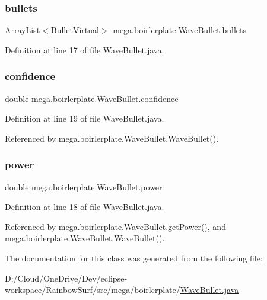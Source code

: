 \subsubsection{\texorpdfstring{bullets}{bullets}}
{\footnotesize\ttfamily Array\+List$<$\hyperlink{classmega_1_1boirlerplate_1_1_bullet_virtual}{Bullet\+Virtual}$>$ mega.\+boirlerplate.\+Wave\+Bullet.\+bullets\hspace{0.3cm}{\ttfamily [private]}}



Definition at line 17 of file Wave\+Bullet.\+java.

\mbox{\label{classmega_1_1boirlerplate_1_1_wave_bullet_a2f18f8028e213b6e7d418f12d14e49bb}} 
\subsubsection{\texorpdfstring{confidence}{confidence}}
{\footnotesize\ttfamily double mega.\+boirlerplate.\+Wave\+Bullet.\+confidence\hspace{0.3cm}{\ttfamily [private]}}



Definition at line 19 of file Wave\+Bullet.\+java.



Referenced by mega.\+boirlerplate.\+Wave\+Bullet.\+Wave\+Bullet().

\mbox{\label{classmega_1_1boirlerplate_1_1_wave_bullet_a8422491b39fbed8ad80e60771a18d874}} 
\subsubsection{\texorpdfstring{power}{power}}
{\footnotesize\ttfamily double mega.\+boirlerplate.\+Wave\+Bullet.\+power\hspace{0.3cm}{\ttfamily [private]}}



Definition at line 18 of file Wave\+Bullet.\+java.



Referenced by mega.\+boirlerplate.\+Wave\+Bullet.\+get\+Power(), and mega.\+boirlerplate.\+Wave\+Bullet.\+Wave\+Bullet().



The documentation for this class was generated from the following file\+:\begin{DoxyCompactItemize}
\item 
D\+:/\+Cloud/\+One\+Drive/\+Dev/eclipse-\/workspace/\+Rainbow\+Surf/src/mega/boirlerplate/\hyperlink{_wave_bullet_8java}{Wave\+Bullet.\+java}\end{DoxyCompactItemize}
